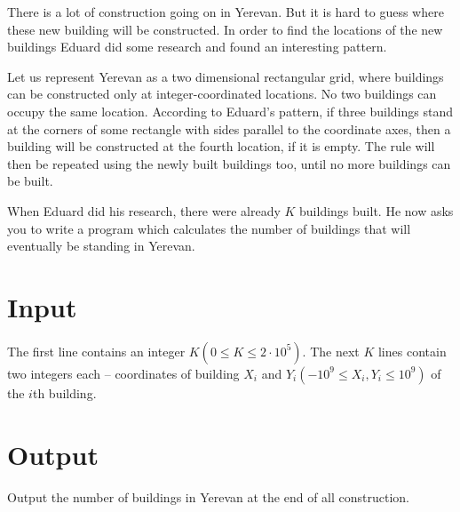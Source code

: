 

There is a lot of construction going on in Yerevan.
But it is hard to guess where these new building will be constructed.
In order to find the locations of the new buildings Eduard did some research and found an interesting pattern.

Let us represent Yerevan as a two dimensional rectangular grid, where buildings can be constructed only at integer-coordinated locations.
No two buildings can occupy the same location.
According to Eduard's pattern, if three buildings stand at the corners of some rectangle with sides parallel to the coordinate axes, then a building will be constructed at the fourth location, if it is empty.
The rule will then be repeated using the newly built buildings too, until no more buildings can be built.

When Eduard did his research, there were already $K$ buildings built.
He now asks you to write a program which calculates the number of buildings that will eventually be standing in Yerevan.



\section*{Input}
The first line contains an integer $K (0 \leq K \leq 2 \cdot 10^5)$.
The next $K$ lines contain two integers each -- coordinates of building $X_i$ and $Y_i (−10^9 \leq X_i, Y_i \leq 10^9)$ of the $i$th building.

\section*{Output}
Output the number of buildings in Yerevan at the end of all construction.
